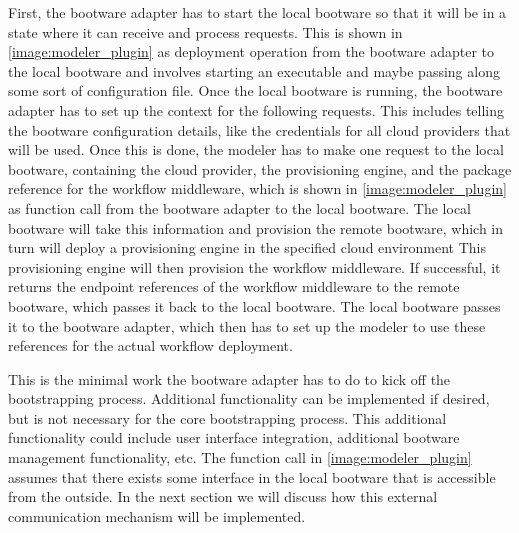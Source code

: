 First, the bootware adapter has to start the local bootware so that it will be in a state where it can receive and process requests.
This is shown in \autoref{image:modeler_plugin} as deployment operation from the bootware adapter to the local bootware and involves starting an executable and maybe passing along some sort of configuration file.
Once the local bootware is running, the bootware adapter has to set up the context for the following requests.
This includes telling the bootware configuration details, like the credentials for all cloud providers that will be used.
Once this is done, the modeler has to make one request to the local bootware, containing the cloud provider, the provisioning engine, and the package reference for the workflow middleware, which is shown in \autoref{image:modeler_plugin} as function call from the bootware adapter to the local bootware.
The local bootware will take this information and provision the remote bootware, which in turn will deploy a provisioning engine in the specified cloud environment
This provisioning engine will then provision the workflow middleware.
If successful, it returns the endpoint references of the workflow middleware to the remote bootware, which passes it back to the local bootware.
The local bootware passes it to the bootware adapter, which then has to set up the modeler to use these references for the actual workflow deployment.

This is the minimal work the bootware adapter has to do to kick off the bootstrapping process.
Additional functionality can be implemented if desired, but is not necessary for the core bootstrapping process.
This additional functionality could include user interface integration, additional bootware management functionality, etc.
The function call in \autoref{image:modeler_plugin} assumes that there exists some interface in the local bootware that is accessible from the outside.
In the next section we will discuss how this external communication mechanism will be implemented.

